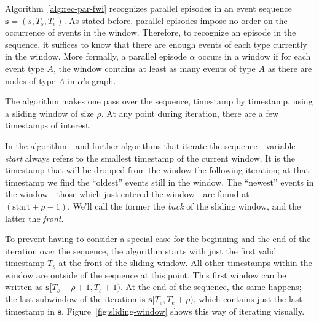 Algorithm~\ref{alg:rec-par-fwi} recognizes parallel episodes in an event sequence $ \boldsymbol{s} = (s, T_s, T_e) $. As stated before, parallel episodes impose no order on the occurrence of events in the window. Therefore, to recognize an episode in the sequence, it suffices to know that there are enough events of each type currently in the window. More formally, a parallel episode $ \alpha $ occurs in a window if for each event type $ A $, the window contains at least as many events of type $ A $ as there are nodes of type $ A $ in $ \alpha $'s graph.

The algorithm makes one pass over the sequence, timestamp by timestamp, using a sliding window of size $ \rho $. At any point during iteration, there are a few timestamps of interest.

In the algorithm---and further algorithms that iterate the sequence---variable \emph{start} always refers to the smallest timestamp of the current window. It is the timestamp that will be dropped from the window the following iteration; at that timestamp we find the ``oldest'' events still in the window. The ``newest'' events in the window---those which just entered the window---are found at $ (\text{start} + \rho - 1) $. We'll call the former the \emph{back} of the sliding window, and the latter the \emph{front}.

To prevent having to consider a special case for the beginning and the end of the iteration over the sequence, the algorithm starts with just the first valid timestamp $ T_s $ at the front of the sliding window. All other timestamps within the window are outside of the sequence at this point. This first window can be written as $ \boldsymbol{s}[T_s - \rho + 1, T_s + 1) $. At the end of the sequence, the same happens; the last subwindow of the iteration is $ \boldsymbol{s}[T_e, T_e + \rho) $, which contains just the last timestamp in $ \boldsymbol{s} $. Figure~\ref{fig:sliding-window} shows this way of iterating visually.

